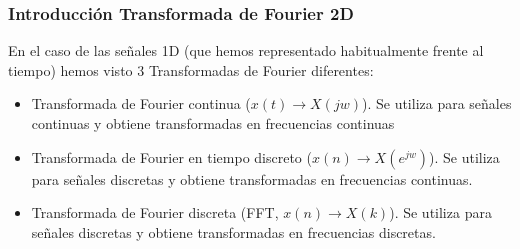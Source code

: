\documentclass[handout]{beamer}
\numberwithin{section}{part}
\begin{document}
\begin{frame}
\frametitle{Introducci\'{o}n Transformada de Fourier 2D}

\small

En el caso de las se\~{n}ales 1D (que hemos representado habitualmente frente al tiempo) hemos visto 3 Transformadas de Fourier diferentes:
\begin{itemize}

\item Transformada de Fourier continua ($x(t) \rightarrow X(jw)$). Se utiliza para se\~{n}ales continuas y obtiene transformadas en frecuencias continuas

\item Transformada de Fourier en tiempo discreto ($x(n) \rightarrow X(e^{jw})$). Se utiliza para se\~{n}ales discretas y obtiene transformadas en frecuencias continuas.

\item Transformada de Fourier discreta (FFT, $x(n) \rightarrow X(k)$). Se utiliza para se\~{n}ales discretas y obtiene transformadas en frecuencias discretas.

\end{itemize}


\vspace{0.1cm}

\end{frame}
\end{document}
